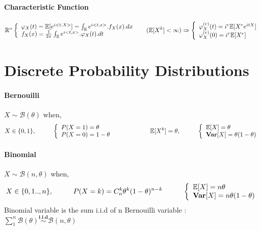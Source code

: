 \documentclass[a4paper,10pt]{article}
\begin{document}
\paragraph{Characteristic Function}
\[
\mathbb{R}^{n}
\left\{
\begin{array}{l}
\varphi_{X}(t)= \mathbb{E}[e^{i<t,X>}] = \int_{\mathbb{R}} e^{i<t,x>} . f_{X}(x).dx \\
f_{X}(x) = \frac{1}{2\pi}\int_{\mathbb{R}} e^{i<t,x>} . \varphi_{X}(t).dt
\end{array}\right. 
\hspace{5mm}
(\mathbb{E}[X^{k}]< \infty) \Rightarrow 
\left\{
\begin{array}{l}
\varphi_{X}^{(r)}(t)= i^{r}\mathbb{E}[X^{r}e^{itX}] \\
\varphi_{X}^{(r)}(0)= i^{r}\mathbb{E}[X^{r}]
\end{array}\right. 
\]


\section{Discrete Probability Distributions}

\paragraph{Bernouilli} $X\sim \mathcal{B}(\theta)$ when, 
\[
X \in \{0,1\} , 
\hspace{10mm}
\left\{
\begin{array}{l}
P(X=1)=\theta \\
P(X=0)=1-\theta
\end{array}\right.
\hspace{20mm}
\mathbb{E}[X^k]=\theta,
\hspace{10mm}
\left\{
\begin{array}{l}
\mathbb{E}[X]=\theta \\
\textbf{Var}[X]=\theta (1-\theta)
\end{array}\right.
\]

\paragraph{Binomial} $X\sim \mathcal{B}(n,\theta)$ when,
\[
X \in \{0,1 .. , n\} , 
\hspace{10mm}
P(X=k)=C^k_n\theta ^k (1-\theta)^{n-k} 
\hspace{10mm}
\left\{
\begin{array}{l}
\mathbb{E}[X]=n\theta \\
\textbf{Var}[X]=n \theta (1-\theta) 
\end{array}\right.
\]
Binomial variable is the sum i.i.d of n Bernouilli variable : $\sum_1^n \mathcal{B}(\theta) \stackrel{\textbf{i.i.d}}{\sim}  \mathcal{B}(n,\theta) $
\end{document}

